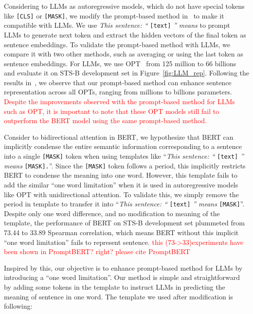 \documentclass{article}
\begin{document}
Considering to LLMs as autoregressive models, which do not have special tokens like \texttt{[CLS]} or \texttt{[MASK]}, we modify the prompt-based method in~\cite{jiang2022promptbert} to make it compatible with LLMs.
We use \textit{This sentence: ``} \texttt{[text]} \textit{'' means} to prompt LLMs to generate next token and extract the hidden vectors of the final token as sentence embeddings.
To validate the prompt-based method with LLMs, we compare it with two other methods, such as averaging or using the last token as sentence embeddings.
For LLMs, we use OPT~\cite{zhang2022opt} from 125 million to 66 billions and evaluate it on STS-B development set in Figure~\ref{fig:LLM_rep}.
Following the results in~\cite{jiang2022promptbert}, we observe that our prompt-based method can enhance sentence representation across all OPTs, ranging from millions to billions parameters.
\textcolor{red}{Despite the improvements observed with the prompt-based method for LLMs such as OPT, it is important to note that these OPT models still fail to outperform the BERT model using the same prompt-based method. }


Consider to bidirectional attention in BERT, we hypothesize that BERT can implicitly condense the entire semantic information corresponding to a sentence into a single \texttt{[MASK]} token when using templates like ``\textit{This sentence: ``} \texttt{[text]} \textit{'' means} \texttt{[MASK].}''.
Since the \texttt{[MASK]} token follows a period, this implicitly restricts BERT to condense the meaning into one word. 
However, this template fails to add the similar ``one word limitation'' when it is used in autoregressive models like OPT with unidirectional attention.
To validate this, we simply remove the period in template to transfer it into ``\textit{This sentence: ``} \texttt{[text]} \textit{'' means} \texttt{[MASK]}''.
Despite only one word difference, and no modification to meaning of the template, the performance of BERT on STS-B development set plummeted from 73.44 to 33.89 Spearman correlation, which means BERT without this implicit ``one word limitation'' fails to represent sentence. \textcolor{red}{this (73->33)experiments have been shown in PromptBERT? right? please cite PromptBERT}

Inspired by this, our objective is to enhance prompt-based method for LLMs by introducing a ``one word limitation''.
Our method is simple and straightforward by adding some tokens in the template to instruct LLMs in predicting the meaning of sentence in one word.
The template we used after modification is following:
\end{document}
